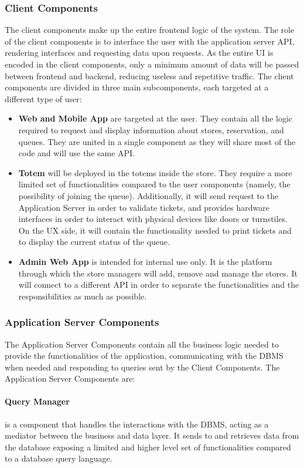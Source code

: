 \subsubsection{Client Components}
The client components make up the entire frontend logic of the system.
The role of the client components is to interface the user with the application server API, rendering interfaces and requesting data upon requests. As the entire UI is encoded in the client components, only a minimum amount of data will be passed between frontend and backend, reducing useless and repetitive traffic.
The client components are divided in three main subcomponents, each targeted at a different type of user:
\begin{itemize}
    \item \textbf{Web and Mobile App} are targeted at the user. They contain all the logic required to request and display information about stores, reservation, and queues. They are united in a single component as they will share most of the code and will use the same API.
    \item \textbf{Totem} will be deployed in the totems inside the store. They require a more limited set of functionalities compared to the user components (namely, the possibility of joining the queue). Additionally, it will send request to the Application Server in order to validate tickets, and provides hardware interfaces in order to interact with physical devices like doors or turnstiles. On the UX side, it will contain the functionality needed to print tickets and to display the current status of the queue.
    \item \textbf{Admin Web App} is intended for internal use only. It is the platform through which the store managers will add, remove and manage the stores. It will connect to a different API in order to separate the functionalities and the responsibilities as much as possible.
\end{itemize}


\subsubsection{Application Server Components}
The Application Server Components contain all the business logic needed to provide the functionalities of the application, communicating with the DBMS when needed and responding to queries sent by the Client Components.
The Application Server Components are:

\paragraph{Query Manager} is a component that handles the interactions with the DBMS, acting as a mediator between the business and data layer. It sends to and retrieves data from the database exposing a limited and higher level set of functionalities compared to a database query language.

